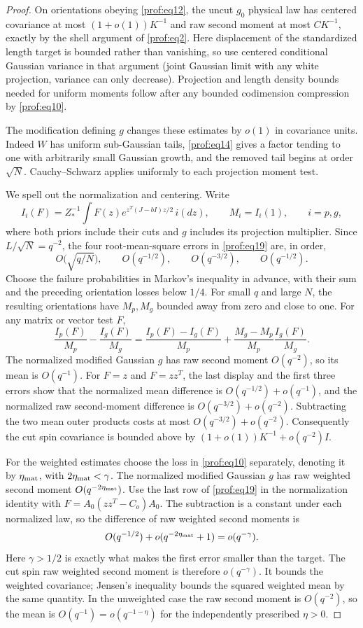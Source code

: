 \begin{proof}
On orientations obeying \eqref{prof:eq12}, the uncut \(g_0\) physical law has centered covariance at most \((1+o(1))K^{-1}\) and raw second moment at most \(C K^{-1}\), exactly by the shell argument of \eqref{prof:eq2}. Here displacement of the standardized length target is bounded rather than vanishing, so use centered conditional Gaussian variance in that argument (joint Gaussian limit with any white projection, variance can only decrease). Projection and length density bounds needed for uniform moments follow after any bounded codimension compression by \eqref{prof:eq10}.

The modification defining \(g\) changes these estimates by
\(o(1)\) in covariance units. Indeed \(W\) has uniform sub-Gaussian
tails, \eqref{prof:eq14} gives a factor tending to one with
arbitrarily small Gaussian growth, and the removed tail begins at
order \(\sqrt N\). Cauchy--Schwarz applies uniformly to each
projection moment test.

We spell out the normalization and centering. Write
\[
 I_i(F)=Z_*^{-1}\int F(z)e^{z^T(J-bI)z/2}\,i(dz),
 \qquad M_i=I_i(1),\qquad i=p,g,
\]
where both priors include their cuts and \(g\) includes its
projection multiplier. Since \(L/\sqrt N=q^{-2}\), the four
root-mean-square errors in \eqref{prof:eq19} are, in order,
\[
 O\bigl(\sqrt{q/N}\bigr),\qquad O(q^{-1/2}),\qquad
 O(q^{-3/2}),\qquad O(q^{-1/2}).
\]
Choose the failure probabilities in Markov's inequality in advance,
with their sum and the preceding orientation losses below \(1/4\).
For small \(q\) and large \(N\), the resulting orientations have
\(M_p,M_g\) bounded away from zero and close to one. For any matrix
or vector test \(F\),
\[
 \frac{I_p(F)}{M_p}-\frac{I_g(F)}{M_g}
 =\frac{I_p(F)-I_g(F)}{M_p}
   +\frac{M_g-M_p}{M_p}\frac{I_g(F)}{M_g}.
\]
The normalized modified Gaussian \(g\) has raw second moment
\(O(q^{-2})\), so its mean is \(O(q^{-1})\). For \(F=z\) and
\(F=zz^T\), the last display and
the first three errors show that the normalized mean difference is
\(O(q^{-1/2})+o(q^{-1})\), and the normalized raw second-moment
difference is \(O(q^{-3/2})+o(q^{-2})\). Subtracting the two mean
outer products costs at most \(O(q^{-3/2})+o(q^{-2})\).
Consequently the cut spin covariance is bounded above by
\((1+o(1))K^{-1}+o(q^{-2})I\).

For the weighted estimates choose the loss in
\eqref{prof:eq10} separately, denoting it by \(\eta_{\rm mat}\),
with \(2\eta_{\rm mat}<\gamma\). The normalized modified Gaussian
\(g\) has raw weighted second moment \(O(q^{-2\eta_{\rm mat}})\).
Use the last row of \eqref{prof:eq19} in the normalization identity
with \(F=A_0(zz^T-C_o)A_0\). The subtraction is a constant under
each normalized law, so the difference of raw weighted second
moments is
\[
 O(q^{-1/2})+o(q^{-2\eta_{\rm mat}}+1)=o(q^{-\gamma}).
\]
Here \(\gamma>1/2\) is exactly what makes the first error smaller
than the target. The cut spin raw weighted second moment is
therefore \(o(q^{-\gamma})\). It bounds the weighted covariance;
Jensen's inequality bounds the squared weighted mean by the same
quantity. In the unweighted case the raw second moment is
\(O(q^{-2})\), so the mean is \(O(q^{-1})=o(q^{-1-\eta})\) for
the independently prescribed \(\eta>0\).


\end{proof}

